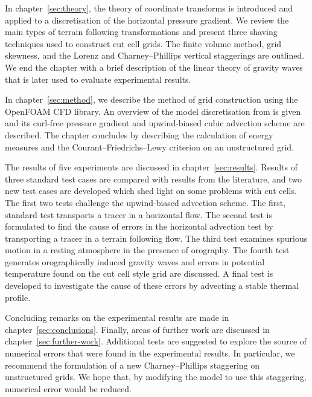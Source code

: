 In chapter~\ref{sec:theory}, the theory of coordinate transforms is introduced and applied to a discretisation of the horizontal pressure gradient.  We review the main types of terrain following transformations and present three shaving techniques used to construct cut cell grids.  The finite volume method, grid skewness, and the Lorenz and Charney--Phillips vertical staggerings are outlined.  We end the chapter with a brief description of the linear theory of gravity waves that is later used to evaluate experimental results.

In chapter~\ref{sec:method}, we describe the method of grid construction using the OpenFOAM CFD library.  An overview of the model discretisation from \textcite{weller-shahrokhi2014} is given and its curl-free pressure gradient and upwind-biased cubic advection scheme are described.  The chapter concludes by describing the calculation of energy measures and the Courant--Friedrichs--Lewy criterion on an unstructured grid.

The results of five experiments are discussed in chapter~\ref{sec:results}.  Results of three standard test cases are compared with results from the literature, and two new test cases are developed which shed light on some problems with cut cells.  The first two tests challenge the upwind-biased advection scheme.  The first, standard test transports a tracer in a horizontal flow.  The second test is formulated to find the cause of errors in the horizontal advection test by transporting a tracer in a terrain following flow.  The third test examines spurious motion in a resting atmosphere in the presence of orography.  The fourth test generates orographically induced gravity waves and errors in potential temperature found on the cut cell style grid are discussed.  A final test is developed to investigate the cause of these errors by advecting a stable thermal profile.

Concluding remarks on the experimental results are made in chapter~\ref{sec:conclusions}.  Finally, areas of further work are discussed in chapter~\ref{sec:further-work}.  Additional tests are suggested to explore the source of numerical errors that were found in the experimental results.  In particular, we recommend the formulation of a new Charney--Phillips staggering on unstructured grids.  We hope that, by modifying the model to use this staggering, numerical error would be reduced.
